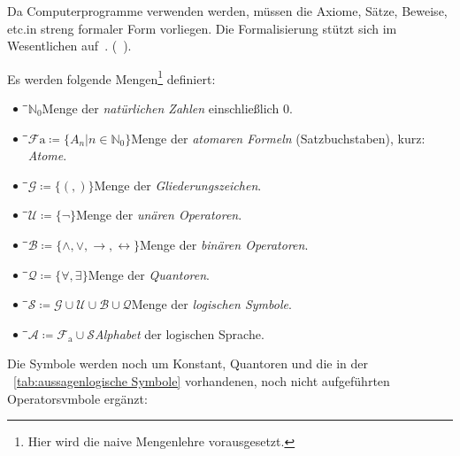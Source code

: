 \documentclass[english,ngerman,parskip=half,headsepline,footsepline]{scrreprt}
\makeatletter
\newcommand{\limp}{\operatorname{\rightarrow}}         %
\newcommand{\lequiv}{\operatorname{\leftrightarrow}}   %
\newcommand{\defeq}{\coloneqq}
\newcommand{\textetc}{etc.\@}
\makeatother
\begin{document}
	Da Computerprogramme verwenden werden, müssen die Axiome, Sätze, Beweise, \textetc in streng formaler Form vorliegen. Die Formalisierung stützt sich im Wesentlichen auf~\cite{bib:Aussagenlogik}. (\alsoname~\cite{bib:LogikDe, bib:LogikEn}).

	Es werden folgende Mengen\footnote{ Hier wird die naive Mengenlehre vorausgesetzt.} definiert:
	\begin{itemize}
		\newcommand{\Item}[3]{\item\begin{tabbing}\hspace{0.7cm}\=\hspace{5cm}\=\kill #1\>#2\>#3\end{tabbing}}

		\Item{$\mathbb{N}_0$}{}
		{Menge der \emph{natürlichen Zahlen} einschließlich $0$.}

		\Item{$\mathcal{F}\mathrm{a}$}{$\defeq\{A_n|n\in \mathbb{N}_0\}$}
		{Menge der \emph{atomaren Formeln} (Satzbuchstaben), kurz: \emph{Atome}.}

		\Item{$\mathcal{G}$}{$\defeq\{(,)\}$}
		{Menge der \emph{Gliederungszeichen}.}

		\Item{$\mathcal{U}$}{$\defeq\{\lnot\}$}
		{Menge der \emph{unären Operatoren}.}

		\Item{$\mathcal{B}$}{$\defeq\{\land,\lor,\limp,\lequiv\}$}
		{Menge der \emph{binären Operatoren}.}

		\Item{$\mathcal{Q}$}{$\defeq\{\forall,\exists\}$}
		{Menge der \emph{Quantoren}.}

		\Item{$\mathcal{S}$}{$\defeq\mathcal{G}\cup\mathcal{U}\cup\mathcal{B}\cup\mathcal{Q}$}
		{Menge der \emph{logischen Symbole}.}

		\Item{$\mathcal{A}$}{$\defeq\mathcal{F}_\mathrm{a}\cup\mathcal{S}$}
		{\emph{Alphabet} der logischen Sprache.}

	\end{itemize}

	Die Symbole werden noch um Konstant, Quantoren und die in der \tablename~\vref{tab:aussagenlogische Symbole} vorhandenen, noch nicht aufgeführten Operatorsvmbole ergänzt:
\end{document}

